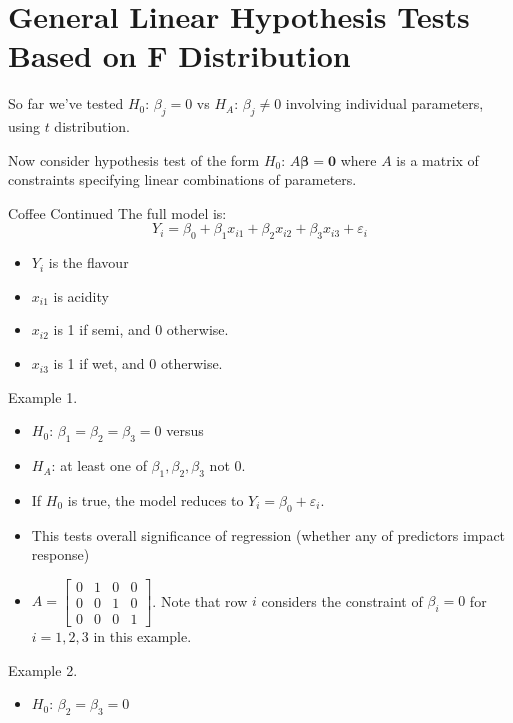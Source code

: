 \section{General Linear Hypothesis Tests Based on F Distribution}
So far we've tested $ H_0 $: $ \beta_j=0 $
vs $ H_A $: $ \beta_j\neq 0 $
involving individual parameters,
using $ t $ distribution.

Now consider hypothesis test of the form $ H_0 $: $ A\symbf{\beta}=\symbf{0} $
where $ A $ is a matrix of constraints specifying
linear combinations of parameters.

\begin{Example}{Coffee Continued}{}
    The full model is:
    \[ Y_i=\beta_0+\beta_1x_{i1}+\beta_2x_{i2}+\beta_3x_{i3}+\varepsilon_i \]
    \begin{itemize}
        \item $ Y_i $ is the flavour
        \item $ x_{i1} $ is acidity
        \item $ x_{i2} $ is 1 if semi, and 0 otherwise.
        \item $ x_{i3} $ is 1 if wet, and 0 otherwise.
    \end{itemize}
    Example 1.
    \begin{itemize}
        \item $ H_0 $: $ \beta_1=\beta_2=\beta_3=0 $ versus
        \item $ H_A $: at least one of $ \beta_1,\beta_2,\beta_3 $
              not 0.
        \item If $ H_0 $ is true, the model reduces to
              $ Y_i=\beta_0+\varepsilon_i $.
        \item This tests overall significance of regression
              (whether any of predictors impact response)
        \item $ A=\begin{bmatrix}
                      0 & 1 & 0 & 0 \\
                      0 & 0 & 1 & 0 \\
                      0 & 0 & 0 & 1
                  \end{bmatrix} $. Note that row $ i $ considers
              the constraint of $ \beta_i=0 $ for $ i=1,2,3 $
              in this example.
    \end{itemize}
    Example 2.
    \begin{itemize}
        \item $ H_0 $: $ \beta_2=\beta_3=0 $

\end{itemize}
\end{Example}
